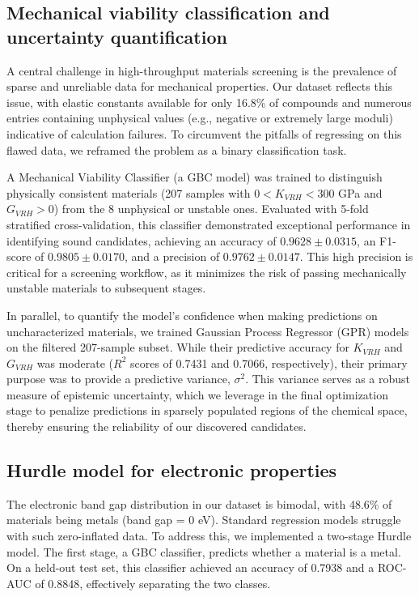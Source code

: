 \documentclass[]{article}
\begin{document}
\subsection{Mechanical viability classification and uncertainty quantification}

A central challenge in high-throughput materials screening is the prevalence of sparse and unreliable data for mechanical properties. Our dataset reflects this issue, with elastic constants available for only 16.8\% of compounds and numerous entries containing unphysical values (e.g., negative or extremely large moduli) indicative of calculation failures. To circumvent the pitfalls of regressing on this flawed data, we reframed the problem as a binary classification task.

A Mechanical Viability Classifier (a GBC model) was trained to distinguish physically consistent materials (207 samples with $0 < K_{VRH} < 300$ GPa and $G_{VRH} > 0$) from the 8 unphysical or unstable ones. Evaluated with 5-fold stratified cross-validation, this classifier demonstrated exceptional performance in identifying sound candidates, achieving an accuracy of $0.9628 \pm 0.0315$, an F1-score of $0.9805 \pm 0.0170$, and a precision of $0.9762 \pm 0.0147$. This high precision is critical for a screening workflow, as it minimizes the risk of passing mechanically unstable materials to subsequent stages.

In parallel, to quantify the model's confidence when making predictions on uncharacterized materials, we trained Gaussian Process Regressor (GPR) models on the filtered 207-sample subset. While their predictive accuracy for $K_{VRH}$ and $G_{VRH}$ was moderate ($R^2$ scores of 0.7431 and 0.7066, respectively), their primary purpose was to provide a predictive variance, $\sigma^2$. This variance serves as a robust measure of epistemic uncertainty, which we leverage in the final optimization stage to penalize predictions in sparsely populated regions of the chemical space, thereby ensuring the reliability of our discovered candidates.

\subsection{Hurdle model for electronic properties}

The electronic band gap distribution in our dataset is bimodal, with 48.6\% of materials being metals (band gap = 0 eV). Standard regression models struggle with such zero-inflated data. To address this, we implemented a two-stage Hurdle model. The first stage, a GBC classifier, predicts whether a material is a metal. On a held-out test set, this classifier achieved an accuracy of 0.7938 and a ROC-AUC of 0.8848, effectively separating the two classes.
\end{document}

